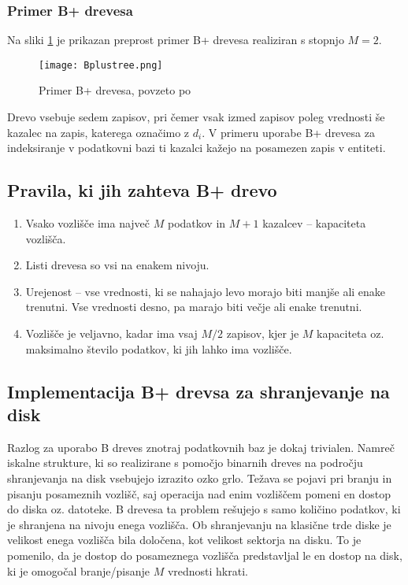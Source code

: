 \documentclass[a4paper,12pt,openright]{book}
\begin{document}
        \subsubsection{Primer B+ drevesa}
        Na sliki \ref{btree_example} je prikazan preprost primer B+ drevesa realiziran s stopnjo $M=2$.
        
        \begin{figure}[h]        
            \centerline{\texttt{[image: Bplustree.png]}}
            \caption{Primer B+ drevesa, povzeto po \cite{BPTREE}}
            \label{btree_example}
        \end{figure}

        \noindent
        Drevo vsebuje sedem zapisov, pri čemer vsak izmed zapisov poleg vrednosti še kazalec na zapis, katerega označimo z $d_i$. V primeru uporabe B+ drevesa za indeksiranje v podatkovni bazi ti kazalci kažejo na posamezen zapis v entiteti.
        
        \subsection{Pravila, ki jih zahteva B+ drevo}
        \begin{enumerate}
            \item Vsako vozlišče ima največ $M$ podatkov in $M+1$ kazalcev – kapaciteta vozlišča.
            \item Listi drevesa so vsi na enakem nivoju.
            \item Urejenost – vse vrednosti, ki se nahajajo levo morajo biti manjše ali enake trenutni. Vse vrednosti desno, pa marajo biti večje ali enake trenutni.
            \item Vozlišče je veljavno, kadar ima vsaj $M/2$ zapisov, kjer je $M$ kapaciteta oz. maksimalno število podatkov, ki jih lahko ima vozlišče.
        \end{enumerate}

        \subsection{Implementacija B+ drevsa za shranjevanje na disk}
        Razlog za uporabo B dreves znotraj podatkovnih baz je dokaj trivialen. Namreč iskalne strukture, ki so realizirane s pomočjo binarnih dreves na področju shranjevanja na disk vsebujejo izrazito ozko grlo. Težava se pojavi pri branju in pisanju posameznih vozlišč, saj operacija nad enim vozliščem pomeni en dostop do diska oz. datoteke. B drevesa ta problem rešujejo s samo količino podatkov, ki je shranjena na nivoju enega vozlišča. Ob shranjevanju na klasične trde diske je velikost enega vozlišča bila določena, kot velikost sektorja na disku. To je pomenilo, da je dostop do posameznega vozlišča predstavljal le en dostop na disk, ki je omogočal branje/pisanje $M$ vrednosti hkrati.
\end{document}
